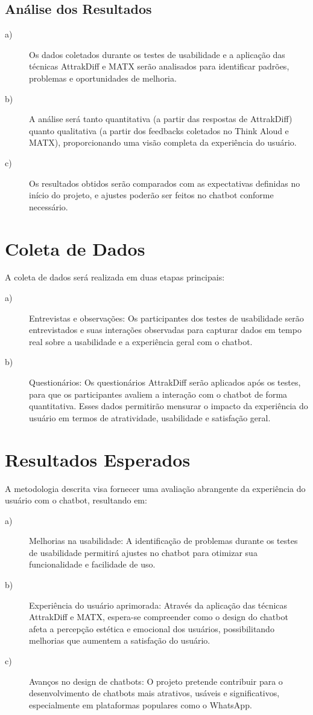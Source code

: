 \subsection{Análise dos Resultados}
\begin{description}
    \item[a)] Os dados coletados durante os testes de usabilidade e a aplicação das técnicas AttrakDiff e MATX serão analisados para identificar padrões, problemas e oportunidades de melhoria.
    \item[b)] A análise será tanto quantitativa (a partir das respostas de AttrakDiff) quanto qualitativa (a partir dos feedbacks coletados no Think Aloud e MATX), proporcionando uma visão completa da experiência do usuário.
    \item[c)] Os resultados obtidos serão comparados com as expectativas definidas no início do projeto, e ajustes poderão ser feitos no chatbot conforme necessário.
\end{description}

\section{Coleta de Dados}
A coleta de dados será realizada em duas etapas principais:
\begin{description}
    \item[a)] Entrevistas e observações: Os participantes dos testes de usabilidade serão entrevistados e suas interações observadas para capturar dados em tempo real sobre a usabilidade e a experiência geral com o chatbot.
    \item[b)] Questionários: Os questionários AttrakDiff serão aplicados após os testes, para que os participantes avaliem a interação com o chatbot de forma quantitativa. Esses dados permitirão mensurar o impacto da experiência do usuário em termos de atratividade, usabilidade e satisfação geral.
\end{description}

\section{Resultados Esperados}
A metodologia descrita visa fornecer uma avaliação abrangente da experiência do usuário com o chatbot, resultando em:
\begin{description}
    \item[a)] Melhorias na usabilidade: A identificação de problemas durante os testes de usabilidade permitirá ajustes no chatbot para otimizar sua funcionalidade e facilidade de uso.
    \item[b)] Experiência do usuário aprimorada: Através da aplicação das técnicas AttrakDiff e MATX, espera-se compreender como o design do chatbot afeta a percepção estética e emocional dos usuários, possibilitando melhorias que aumentem a satisfação do usuário.
    \item[c)] Avanços no design de chatbots: O projeto pretende contribuir para o desenvolvimento de chatbots mais atrativos, usáveis e significativos, especialmente em plataformas populares como o WhatsApp.
\end{description}


